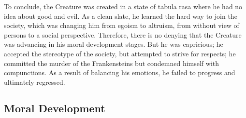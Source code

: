\begin{text}
To conclude, the Creature was created in a state of tabula rasa where he had no idea about good and evil. As a clean slate, he learned the hard way to join the society, which was changing him from egoism to altruism, from without view of persons to a social perspective. Therefore, there is no denying that the Creature was advancing in his moral development stages. But he was capricious; he accepted the stereotype of the society, but attempted to strive for respects; he committed the murder of the Frankensteins but condemned himself with compunctions. As a result of balancing his emotions, he failed to progress and ultimately regressed.

\end{text}
\subsection{Moral Development} %
\label{sub:moral_development}
